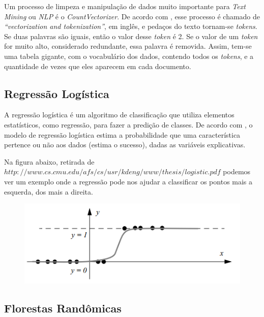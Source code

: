 \documentclass [12pt, a4paper] {article}
\begin{document}
Um processo de limpeza e manipulação de dados muito importante para \textit{Text Mining} ou \textit{NLP} é o \textit{CountVectorizer}. De acordo com \cite{nlp}, esse processo é chamado de \textit{“vectorization and tokenization”}, em inglês, e pedaços do texto tornam-se \textit{tokens}. Se duas palavras são iguais, então o valor desse \textit{token} é 2. Se o valor de um \textit{token} for muito alto, considerado redundante, essa palavra é removida. Assim, tem-se uma tabela gigante, com o vocabulário dos dados, contendo todos os \textit{tokens}, e a quantidade de vezes que eles aparecem em cada documento. 


\subsection{Regressão Logística}

A regressão logística é um algoritmo de classificação que utiliza elementos estatísticos, como regressão, para fazer a predição de classes. De acordo com \cite{stat}, o modelo de regressão logística estima a probabilidade que uma característica pertence ou não aos dados (estima o sucesso), dadas as variáveis explicativas.

Na figura abaixo, retirada de \newline $http://www.cs.cmu.edu/afs/cs/usr/kdeng/www/thesis/logistic.pdf$
\newline
podemos ver um exemplo onde a regressão pode nos ajudar a classificar os pontos mais a esquerda, dos mais a direita.

\begin{figure}[!hbt]
		\begin{center}
		\includegraphics[width=1\columnwidth]{figuras/reglog.png}
		\end{center}
\end{figure}




\subsection{Florestas Randômicas}
\end{document}
